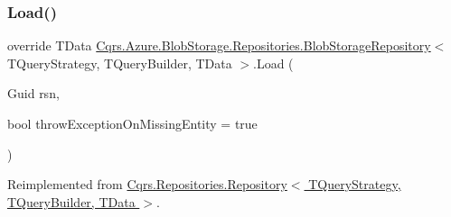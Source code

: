 \subsubsection{\texorpdfstring{Load()}{Load()}}
{\footnotesize\ttfamily override T\+Data \hyperlink{classCqrs_1_1Azure_1_1BlobStorage_1_1Repositories_1_1BlobStorageRepository}{Cqrs.\+Azure.\+Blob\+Storage.\+Repositories.\+Blob\+Storage\+Repository}$<$ T\+Query\+Strategy, T\+Query\+Builder, T\+Data $>$.Load (\begin{DoxyParamCaption}\item[{Guid}]{rsn,  }\item[{bool}]{throw\+Exception\+On\+Missing\+Entity = {\ttfamily true} }\end{DoxyParamCaption})\hspace{0.3cm}{\ttfamily [virtual]}}



Reimplemented from \hyperlink{classCqrs_1_1Repositories_1_1Repository_a444e9dfe4710be90940dbb6dec9d856f}{Cqrs.\+Repositories.\+Repository$<$ T\+Query\+Strategy, T\+Query\+Builder, T\+Data $>$}.

